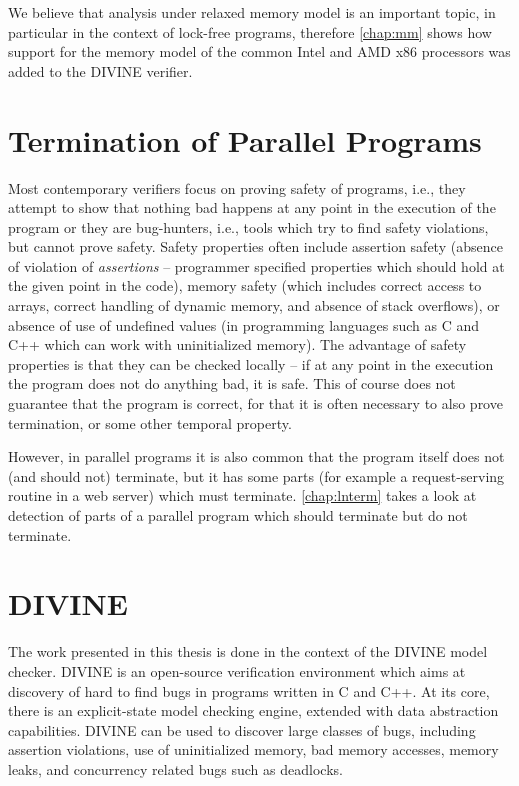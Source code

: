 We believe that analysis under relaxed memory model is an important topic,
in particular in the context of lock-free programs, therefore \autoref{chap:mm}
shows how support for the memory model of the common Intel and AMD x86
processors was added to the DIVINE verifier.

\section{Termination of Parallel Programs}

Most contemporary verifiers focus on proving safety of programs, i.e., they
attempt to show that nothing bad happens at any point in the execution of the
program or they are bug-hunters, i.e., tools which try to find safety violations, but cannot prove safety.
Safety properties often include assertion safety (absence of violation of \emph{assertions} -- programmer specified properties which should hold at the given point in the code), memory safety (which includes correct access to arrays, correct handling of dynamic memory, and absence of stack overflows), or absence of use of undefined values (in programming languages such as C and C++ which can work with uninitialized memory).
The advantage of safety properties is that they can be checked locally -- if at
any point in the execution the program does not do anything bad, it is safe.
This of course does not guarantee that the program is correct, for that it is often necessary to also prove termination, or some other temporal property.

However, in parallel programs it is also common that the program itself does
not (and should not) terminate, but it has some parts (for example a
request-serving routine in a web server) which must terminate.
\autoref{chap:lnterm} takes a look at detection of parts of a parallel program which should terminate but do not terminate.

\section{DIVINE}

The work presented in this thesis is done in the context of the DIVINE model checker.
DIVINE is an open-source verification environment which aims at discovery of hard to find bugs in programs written in C and C++.
At its core, there is an explicit-state model checking engine, extended with data abstraction capabilities.
DIVINE can be used to discover large classes of bugs, including assertion violations, use of uninitialized memory, bad memory accesses, memory leaks, and concurrency related bugs such as deadlocks.


